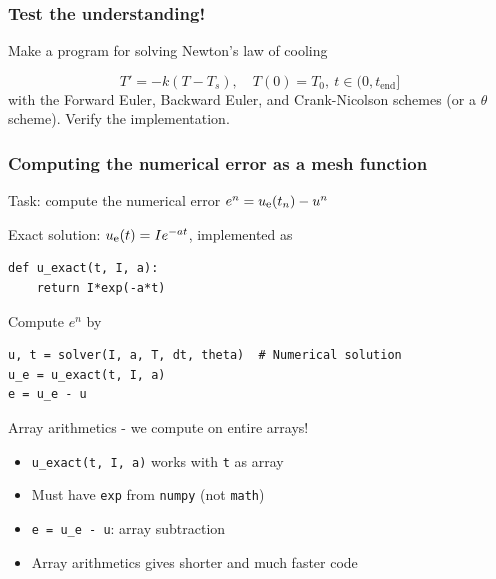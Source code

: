 \documentclass{beamer}
\begin{document}
\begin{frame}
\frametitle{Test the understanding!}

Make a program for solving Newton's law of cooling

\[ T' = -k(T-T_s),\quad T(0)=T_0,\ t\in (0,t_{\mbox{end}}]\]
with the Forward Euler, Backward Euler, and Crank-Nicolson schemes
(or a $\theta$ scheme). Verify the implementation.
\end{frame}

\begin{frame}
\frametitle{Computing the numerical error as a mesh function}

\label{decay:computing:error}

Task: compute the numerical error $e^n = \uex(t_n) - u^n$

Exact solution: $\uex(t)=Ie^{-at}$, implemented as

\begin{verbatim}
def u_exact(t, I, a):
    return I*exp(-a*t)
\end{verbatim}

Compute $e^n$ by

\begin{verbatim}
u, t = solver(I, a, T, dt, theta)  # Numerical solution
u_e = u_exact(t, I, a)
e = u_e - u
\end{verbatim}

\begin{block}{Array arithmetics - we compute on entire arrays! }

\begin{itemize}
 \item \Verb!u_exact(t, I, a)! works with \texttt{t} as array

 \item Must have \texttt{exp} from \texttt{numpy} (not \texttt{math})

 \item \Verb!e = u_e - u!: array subtraction

 \item Array arithmetics gives shorter and much faster code
\end{itemize}

\noindent
\end{block}
\end{frame}
\end{document}
